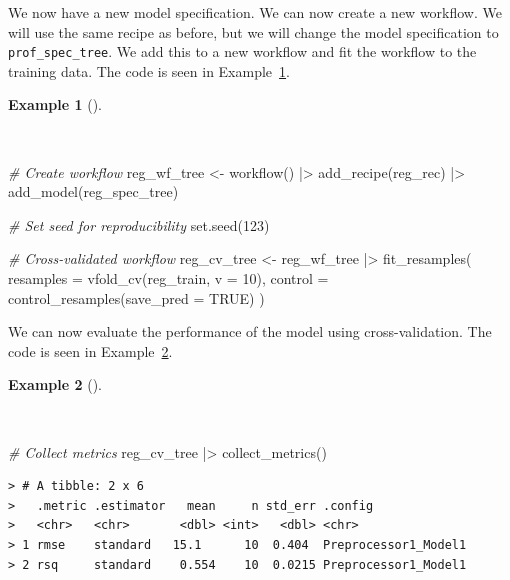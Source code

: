\documentclass[
  letterpaper,
  DIV=11,
  numbers=noendperiod]{scrreprt}
\newenvironment{Shaded}{\begin{snugshade}}{\end{snugshade}}
\newcommand{\AttributeTok}[1]{\textcolor[rgb]{0.00,0.00,0.00}{#1}}
\newcommand{\CommentTok}[1]{\textcolor[rgb]{0.00,0.00,0.00}{\textit{#1}}}
\newcommand{\ConstantTok}[1]{\textcolor[rgb]{0.00,0.00,0.00}{#1}}
\newcommand{\DecValTok}[1]{\textcolor[rgb]{0.00,0.00,0.00}{#1}}
\newcommand{\FunctionTok}[1]{\textcolor[rgb]{0.00,0.00,0.00}{#1}}
\newcommand{\NormalTok}[1]{\textcolor[rgb]{0.00,0.00,0.00}{#1}}
\newcommand{\OtherTok}[1]{\textcolor[rgb]{0.00,0.00,0.00}{#1}}
\newcommand{\SpecialCharTok}[1]{\textcolor[rgb]{0.00,0.00,0.00}{#1}}
\theoremstyle{definition}
\newtheorem{example}{Example}[chapter]
\theoremstyle{remark}
\begin{document}
We now have a new model specification. We can now create a new workflow.
We will use the same recipe as before, but we will change the model
specification to \texttt{prof\_spec\_tree}. We add this to a new
workflow and fit the workflow to the training data. The code is seen in
Example~\ref{exm-pda-reg-model-spec-decision-tree-workflow}.

\begin{example}[]\protect\hypertarget{exm-pda-reg-model-spec-decision-tree-workflow}{}\label{exm-pda-reg-model-spec-decision-tree-workflow}

~

\begin{Shaded}
\begin{Highlighting}[]
\CommentTok{\# Create workflow}
\NormalTok{reg\_wf\_tree }\OtherTok{\textless{}{-}}
  \FunctionTok{workflow}\NormalTok{() }\SpecialCharTok{|\textgreater{}}
  \FunctionTok{add\_recipe}\NormalTok{(reg\_rec) }\SpecialCharTok{|\textgreater{}}
  \FunctionTok{add\_model}\NormalTok{(reg\_spec\_tree)}

\CommentTok{\# Set seed for reproducibility}
\FunctionTok{set.seed}\NormalTok{(}\DecValTok{123}\NormalTok{)}

\CommentTok{\# Cross{-}validated workflow}
\NormalTok{reg\_cv\_tree }\OtherTok{\textless{}{-}}
\NormalTok{  reg\_wf\_tree }\SpecialCharTok{|\textgreater{}}
  \FunctionTok{fit\_resamples}\NormalTok{(}
    \AttributeTok{resamples =} \FunctionTok{vfold\_cv}\NormalTok{(reg\_train, }\AttributeTok{v =} \DecValTok{10}\NormalTok{),}
    \AttributeTok{control =} \FunctionTok{control\_resamples}\NormalTok{(}\AttributeTok{save\_pred =} \ConstantTok{TRUE}\NormalTok{)}
\NormalTok{  )}
\end{Highlighting}
\end{Shaded}

\end{example}

We can now evaluate the performance of the model using cross-validation.
The code is seen in
Example~\ref{exm-pda-reg-model-spec-decision-tree-workflow-evaluate}.

\begin{example}[]\protect\hypertarget{exm-pda-reg-model-spec-decision-tree-workflow-evaluate}{}\label{exm-pda-reg-model-spec-decision-tree-workflow-evaluate}

~

\begin{Shaded}
\begin{Highlighting}[]
\CommentTok{\# Collect metrics}
\NormalTok{reg\_cv\_tree }\SpecialCharTok{|\textgreater{}}
  \FunctionTok{collect\_metrics}\NormalTok{()}
\end{Highlighting}
\end{Shaded}

\begin{verbatim}
> # A tibble: 2 x 6
>   .metric .estimator   mean     n std_err .config             
>   <chr>   <chr>       <dbl> <int>   <dbl> <chr>               
> 1 rmse    standard   15.1      10  0.404  Preprocessor1_Model1
> 2 rsq     standard    0.554    10  0.0215 Preprocessor1_Model1
\end{verbatim}

\end{example}
\end{document}
